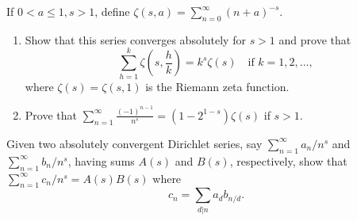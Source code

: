     \begin{problembox}
    If \(0 < a \leq 1, s > 1\), define \(\zeta(s, a) = \sum_{n=0}^{\infty} (n + a)^{-s}\).
    \begin{enumerate}[label=(\alph*)]
    \item Show that this series converges absolutely for \(s > 1\) and prove that
    \[\sum_{h=1}^{k} \zeta \left( s, \frac{h}{k} \right) = k^s \zeta(s) \quad \text{if } k = 1, 2, \ldots,\]
    where \(\zeta(s) = \zeta(s, 1)\) is the Riemann zeta function.
    \item Prove that \(\sum_{n=1}^{\infty} \frac{(-1)^{n-1}}{n^s} = (1 - 2^{1-s}) \zeta(s)\) if \(s > 1\).
    \end{enumerate}
    \end{problembox}
    
    \begin{problembox}
    Given two absolutely convergent Dirichlet series, say \(\sum_{n=1}^{\infty} a_n / n^s\) and \(\sum_{n=1}^{\infty} b_n / n^s\), having sums \(A(s)\) and \(B(s)\), respectively, show that \(\sum_{n=1}^{\infty} c_n / n^s = A(s) B(s)\) where
    \[c_n = \sum_{d|n} a_d b_{n/d}.\]
    \end{problembox}